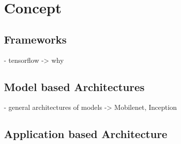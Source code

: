 \section{Concept}
	\subsection{Frameworks}
	- tensorflow -> why	
	\subsection{Model based Architectures}
	 - general architectures of models -> Mobilenet, Inception
	\subsection{Application based Architecture}
